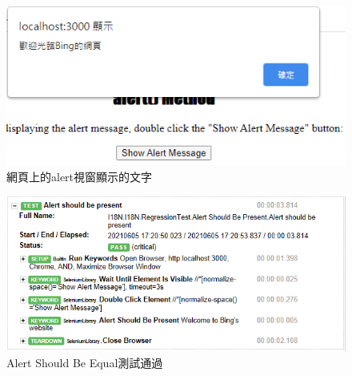 \begin{figure}[H]
\centering
\includegraphics[width= .9\textwidth]{../論文截圖/4-1-2 alert視窗的文字.png}
\caption{網頁上的alert視窗顯示的文字}
\label{網頁上的alert視窗顯示的文字}
\end{figure}

\begin{figure}[H]
\includegraphics[width= \textwidth]{../論文截圖/4.1.1-3 pass.png}
\caption{Alert Should Be Equal測試通過}
\label{Alert Should Be Equal測試通過}
\end{figure}

\hspace*{\fill} \\
\\ \hspace*{\fill} \\
\\ \hspace*{\fill} \\
\\ \hspace*{\fill} \\
\\ \hspace*{\fill} \\
\\ \hspace*{\fill} \\
